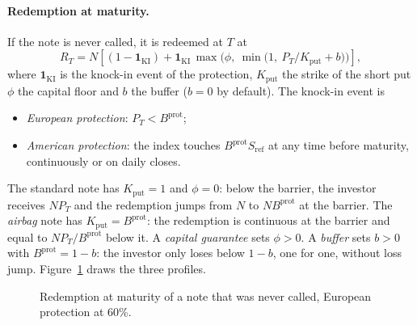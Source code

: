 \documentclass[11pt,a4paper]{article}
\newcommand{\ind}{\mathbf{1}}
\newcommand{\Sref}{S_{\mathrm{ref}}}
\begin{document}
\paragraph{Redemption at maturity.} If the note is never called, it is redeemed at $T$ at
\begin{equation}\label{eq:redemption}
R_T = N\left[(1 - \ind_{\mathrm{KI}}) + \ind_{\mathrm{KI}}\,\max\!\Big(\phi,\ \min\big(1,\ P_T/K_{\mathrm{put}} + b\big)\Big)\right],
\end{equation}
where $\ind_{\mathrm{KI}}$ is the knock-in event of the protection, $K_{\mathrm{put}}$ the strike of the short put
$\phi$ the capital floor and $b$ the buffer ($b = 0$ by default). The knock-in event is
\begin{itemize}
\item \emph{European protection}: $P_T < B^{\mathrm{prot}}$;
\item \emph{American protection}: the index touches $B^{\mathrm{prot}}\Sref$ at any time before maturity,
continuously or on daily closes.
\end{itemize}
The standard note has $K_{\mathrm{put}} = 1$ and $\phi = 0$: below the barrier, the investor receives
$N P_T$ and the redemption jumps from $N$ to $N B^{\mathrm{prot}}$ at the barrier. The \emph{airbag} note has
$K_{\mathrm{put}} = B^{\mathrm{prot}}$: the redemption is continuous at the barrier and equal to
$N P_T / B^{\mathrm{prot}}$ below it. A \emph{capital guarantee} sets $\phi > 0$. A \emph{buffer} sets $b > 0$ with $B^{\mathrm{prot}} = 1 - b$: the investor only loses below $1 - b$, one for one, without loss jump. Figure~\ref{fig:redemption}
draws the three profiles.

\begin{figure}[h]
\centering
{}
\caption{Redemption at maturity of a note that was never called, European protection at 60\%.}
\label{fig:redemption}
\end{figure}
\end{document}
